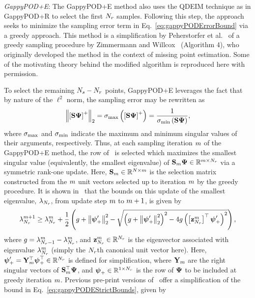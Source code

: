 \vspace{0.5cm}
\noindent \textit{GappyPOD+E}:
The GappyPOD+E method also uses the QDEIM technique as in GappyPOD+R to select the first $N_r$ samples. Following this step, the approach seeks to minimize the sampling error term in Eq.~\ref{eq:gappyPODErrorBound} via a greedy approach. This method is a simplification by Peherstorfer et al.~\cite{Peherstorfer2020} of a greedy sampling procedure by Zimmermann and Willcox~\cite{Zimmermann2016} (Algorithm 4), who originally developed the method in the context of missing point estimation. Some of the motivating theory behind the modified algorithm is reproduced here with permission.

To select the remaining $N_s - N_r$ points, GappyPOD+E leverages the fact that by nature of the $\ell^2$ norm, the sampling error may be rewritten as
%
\begin{equation}
    \left\Vert \left[ \sampMat \deimBasis \right]^+ \right\Vert_2 = \singVal_{\text{max}} \left( \left[\sampMat \deimBasis \right]^+ \right) = \frac{1}{\singVal_{\text{min}} \left( \sampMat \deimBasis \right)},
\end{equation}
%
where $\sigma_{\text{max}}$ and $\sigma_{\text{min}}$ indicate the maximum and minimum singular values of their arguments, respectively. Thus, at each sampling iteration $m$ of the GappyPOD+E method, the row of \deimBasis\ is selected which maximizes the smallest singular value (equivalently, the smallest eigenvalue) of $\sampMat_{\greedyIdx} \deimBasis \inRTwo{\greedyIdx}{\numResModes}$ via a symmetric rank-one update. Here, $\mathbf{S}_{m} \in \mathbb{R}^{N \times m}$ is the selection matrix constructed from the $m$ unit vectors selected up to iteration $m$ by the greedy procedure. It is shown in~\cite{Peherstorfer2020} that the bounds on this update of the smallest eigenvalue, $\lambda_{N_r}$, from update step $m$ to $m+1$, is given by
%
\begin{equation}\label{eq:gappyPODEStrictBounds}
    \lambda_{N_r}^{m+1} \ge \lambda_{N_r}^{m} + \frac{1}{2} \left( g + \left\Vert \boldsymbol{\psi}'_+ \right\Vert_2^2 - \sqrt{\left( g + \left\Vert \boldsymbol{\psi}'_+ \right\Vert_2^2 \right)^2 - 4g\left( \left[\mathbf{z}_{N_r}^{m} \right]^\top \boldsymbol{\psi}'_+ \right)^2} \right),
\end{equation}
%
where $g = \lambda_{N_r-1}^{m} - \lambda_{N_r}^{m}$, and $\mathbf{z}_{N_r}^{m} \in \mathbb{R}^{N_r}$ is the eigenvector associated with eigenvalue $\lambda_{N_r}^{m}$ (simply the $N_r$th canonical unit vector here). Here, $\deimBasisREvecRow = \rightEvecMat_{\greedyIdx}^\top \deimBasisRowUpdate^\top \inROne{\numResModes}$ is defined for simplification, where $\rightEvecMat_{\greedyIdx}$ are the right singular vectors of $\sampMat_{\greedyIdx}^\top \deimBasis$, and $\boldsymbol{\psi}_+ \in \mathbb{R}^{1 \times N_r}$ is the row of $\deimBasis$ to be included at greedy iteration $m$. Previous pre-print versions of~\cite{Peherstorfer2020} offer a simplification of the bound in Eq.~\ref{eq:gappyPODEStrictBounds}, given by
